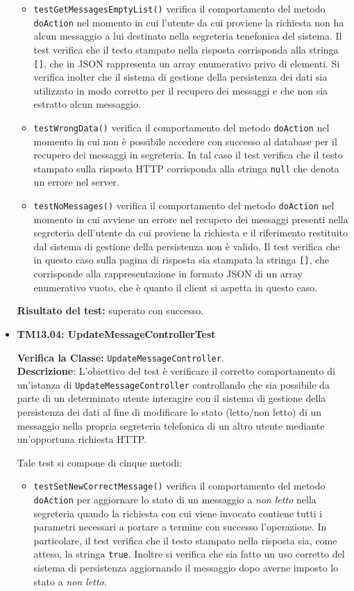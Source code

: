 \begin{itemize}
\begin{itemize}
\item \texttt{testGetMessagesEmptyList()} verifica il comportamento del metodo \texttt{doAction} nel momento in cui l'utente da cui proviene la richiesta non ha alcun messaggio a lui destinato nella segreteria tenefonica del sistema. Il test verifica che il testo stampato nella risposta corrisponda alla stringa \texttt{[]}, che in JSON rappresenta un array enumerativo privo di elementi. Si verifica inolter che il sistema di gestione della persistenza dei dati sia utilizzato in modo corretto per il recupero dei messaggi e che non sia estratto alcun messaggio.

\item \texttt{testWrongData()} verifica il comportamento del metodo \texttt{doAction} nel momento in cui non è possibile accedere con successo al database per il recupero dei messaggi in segreteria. In tal caso il test verifica che il testo stampato sulla risposta HTTP corrisponda alla stringa \texttt{null} che denota un errore nel server.

\item \texttt{testNoMessages()} verifica il comportamento del metodo \texttt{doAction} nel momento in cui avviene un errore nel recupero dei messaggi presenti nella segreteria dell'utente da cui proviene la richiesta e il riferimento restituito dal sistema di gestione della persistenza non è valido. Il test verifica che in questo caso sulla pagina di risposta sia stampata la stringa \texttt{[]}, che corrisponde alla rappresentazione in formato JSON di un array enumerativo vuoto, che è quanto il client si aspetta in questo caso.
\end{itemize}
\textbf{Risultato del test:} superato con successo.


\item[\passed] \textbf{TM13.04: UpdateMessageControllerTest} 

\textbf{Verifica la Classe:} \texttt{UpdateMessageController}.\\
\textbf{Descrizione}: L'obiettivo del test è verificare il corretto comportamento di un'istanza di \texttt{UpdateMessageController} controllando che sia possibile da parte di un determinato utente interagire con il sistema di gestione della persistenza dei dati al fine di modificare lo stato (letto/non letto) di un messaggio nella propria segreteria telefonica di un altro utente mediante un'opportuna richiesta HTTP\@.

Tale test si compone di cinque metodi:
\begin{itemize}
\item \texttt{testSetNewCorrectMessage()} verifica il comportamento del metodo \texttt{doAction} per aggiornare lo stato di un messaggio a \textit{non letto} nella segreteria quando la richiesta con cui viene invocato contiene tutti i parametri necessari a portare a termine con successo l'operazione. In particolare, il test verifica che il testo stampato nella risposta sia, come atteso, la stringa \texttt{true}. Inoltre si verifica che sia fatto un uso corretto del sistema di persistenza aggiornando il messaggio dopo averne imposto lo stato a \textit{non letto}.


\end{itemize}
\end{itemize}
